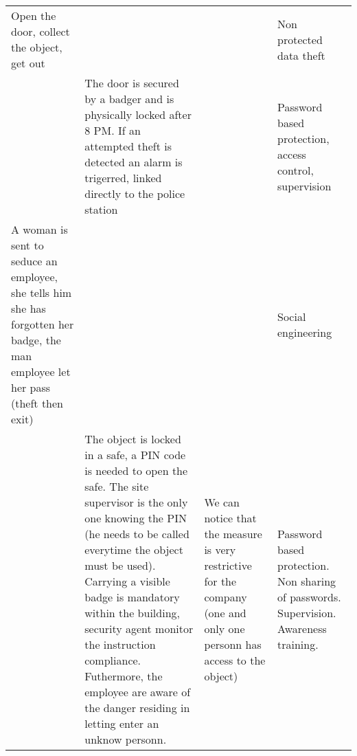 \documentclass[11pt]{article} %
\begin{document}
\begin{longtable}{|p{3cm}|p{3cm}|p{3cm}|p{3cm}|}
Open the door, collect the object, get out & & & Non protected data theft \\
& The door is secured by a badger and is physically locked after 8 PM. 
If an attempted theft is detected an alarm is trigerred, linked directly to the 
police station & & Password based protection, access control, supervision \\
A woman is sent to seduce an employee, she tells him she has forgotten her badge,
the man employee let her pass (theft then exit) & & & Social engineering \\
& The object is locked in a safe, a PIN code is needed to open the safe. The 
site supervisor is the only one knowing the PIN (he needs to be called everytime
the object must be used). Carrying a visible badge is mandatory within the building,
security agent monitor the instruction compliance. Futhermore, the employee
are aware of the danger residing in letting enter an unknow personn.
& We can notice that the measure is very restrictive for the company (one and 
only one personn has access to the object) & Password based protection. Non
sharing of passwords. Supervision. Awareness training.\\

\end{longtable}
\end{document}

